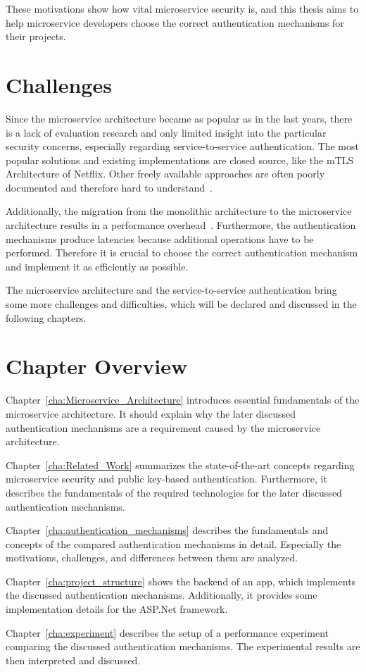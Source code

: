 These motivations show how vital microservice security is, and this thesis aims to help microservice developers choose the correct authentication mechanisms for their projects.

\section{Challenges}
Since the microservice architecture became as popular as in the last years, there is a lack of evaluation research and only limited insight into the particular security concerns, especially regarding service-to-service authentication. 
The most popular solutions and existing implementations are closed source, like the mTLS Architecture of Netflix.
Other freely available approaches are often poorly documented and therefore hard to understand~\cite{yarygina2018overcoming}.

Additionally, the migration from the monolithic architecture to the microservice architecture results in a performance overhead~\cite{ueda2016workload}.
Furthermore, the authentication mechanisms produce latencies because additional operations have to be performed.
Therefore it is crucial to choose the correct authentication mechanism and implement it as efficiently as possible.

The microservice architecture and the service-to-service authentication bring some more challenges and difficulties, which will be declared and discussed in the following chapters.

\section{Chapter Overview}
Chapter~\ref{cha:Microservice_Architecture} introduces essential fundamentals of the microservice architecture. 
It should explain why the later discussed authentication mechanisms are a requirement caused by the microservice architecture.

\noindent Chapter~\ref{cha:Related_Work} summarizes the state-of-the-art concepts regarding microservice security and public key-based authentication.
Furthermore, it describes the fundamentals of the required technologies for the later discussed authentication mechanisms.

\noindent Chapter~\ref{cha:authentication_mechanisms} describes the fundamentals and concepts of the compared authentication mechanisms in detail.
Especially the motivations, challenges, and differences between them are analyzed.

\noindent Chapter~\ref{cha:project_structure} shows the backend of an app, which implements the discussed authentication mechanisms.
Additionally, it provides some implementation details for the ASP.Net framework.

\noindent Chapter~\ref{cha:experiment} describes the setup of a performance experiment comparing the discussed authentication mechanisms.
The experimental results are then interpreted and discussed.

